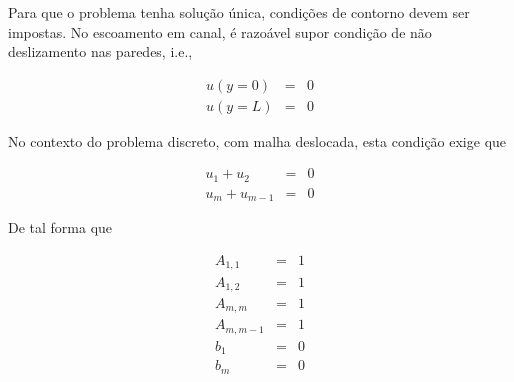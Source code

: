 Para que o problema tenha solução única, condições de contorno devem ser impostas. No escoamento em canal, é razoável supor condição de não deslizamento nas paredes, i.e.,

\begin{subequations}
	\begin{eqnarray}
		u(y=0) &=& 0\\
		u(y=L) &=& 0
	\end{eqnarray}
\end{subequations}

No contexto do problema discreto, com malha deslocada, esta condição exige que

\begin{subequations}
	\begin{eqnarray}
		u_1 + u_2 &=& 0\\
		u_m + u_{m-1} &=& 0
	\end{eqnarray}
\end{subequations}

De tal forma que

\begin{subequations}
	\begin{eqnarray}
	A_{1,1} &=& 1\\
	A_{1,2} &=& 1\\
	A_{m,m} &=& 1\\
	A_{m,m-1} &=& 1\\
	b_1 &=& 0\\
	b_m &=& 0
	\end{eqnarray}
\end{subequations}





